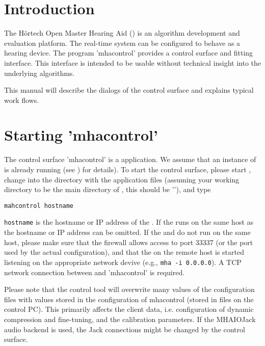 \documentclass[11pt,a4paper,twoside]{article}
\newcommand{\+}{\discretionary{\mbox{\scriptsize$\hookleftarrow$}}{}{}}
\begin{document}
\newpage
\MHAcopyright{}
\newpage
\tableofcontents
\newpage
\renewcommand{\leftmark}{\rightmark}


\section{Introduction}

The H\"{o}rtech Open Master Hearing Aid (\mha{}) is an algorithm 
development and evaluation platform.
%
The real-time system can be configured to behave as a hearing device.
%
The program 'mhacontrol' provides a control surface and fitting
interface.
%
This interface is intended to be usable without technical insight into
the underlying algorithms.

This manual will describe the dialogs of the control surface and
explains typical work flows.

\section{Starting 'mhacontrol'}

The control surface 'mhacontrol' is a \Matlab{}
application.
%
We assume that an instance of \mha{} is already running (see \EngineerManual) for 
details). To start the control surface, please start \Matlab{}, change into the 
directory with the application files (assuming your working directory to be the 
main directory of \mha{}, this should be '\MatlabDir{}'), and type
%
\begin{verbatim}
mahcontrol hostname
\end{verbatim}
%
\verb!hostname! is the hostname or IP address of the \mha{}.
%
If the \mha{} runs on the same host as \Matlab{} the hostname or IP address
can be omitted.
%
If the \mha{} and \Matlab{} do not run on the same host, please make sure
that the firewall allows access to port
33337 (or the port used by the actual \mha{} configuration), and that the
\mha{} on the remote host is started listening on the appropriate network
devive (e.g., \verb!mha -i 0.0.0.0!).
%
A TCP network connection between \mha{} and 'mhacontrol' is required.

Please note that the control tool will overwrite many values of the
\mha{} configuration files with values stored in the configuration of
mhacontrol (stored in \Matlab{} files on the control PC).
%
This primarily affects the client data, i.e. configuration of dynamic
compression and fine-tuning, and the calibration parameters.
%
If the MHAIOJack audio backend is used, the Jack connections might be
changed by the control surface.
\end{document}
